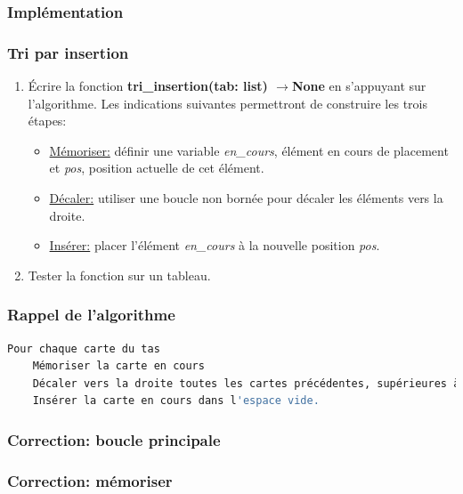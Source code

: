 \documentclass[svgnames,11pt]{beamer}
\begin{document}
\subsubsection{Implémentation}
\begin{frame}
    \frametitle{Tri par insertion}

    \begin{activite}
        \begin{enumerate}
            \item Écrire la fonction \textbf{tri\_insertion(tab: list) $\rightarrow$None} en s'appuyant sur l'algorithme. Les indications suivantes permettront de construire les trois étapes:
                  \begin{itemize}
                      \item \underline{Mémoriser:} définir une variable \emph{en\_cours}, élément en cours de placement et \emph{pos}, position actuelle de cet élément.
                      \item \underline{Décaler:} utiliser une boucle non bornée pour décaler les éléments vers la droite.
                      \item \underline{Insérer:} placer l'élément \emph{en\_cours} à la nouvelle position \emph{pos}.
                  \end{itemize}
            \item Tester la fonction sur un tableau.
        \end{enumerate}
    \end{activite}

\end{frame}

\begin{frame}[fragile]
    \frametitle{Rappel de l'algorithme}

    \begin{center}
        \begin{lstlisting}[language=bash, basicstyle=\small, xrightmargin=1em]
Pour chaque carte du tas
    Mémoriser la carte en cours
    Décaler vers la droite toutes les cartes précédentes, supérieures à la carte en cours.
    Insérer la carte en cours dans l'espace vide.
\end{lstlisting}
        \label{CODE}
    \end{center}

\end{frame}

\begin{frame}
    \frametitle{Correction: boucle principale}

    

\end{frame}
\begin{frame}
    \frametitle{Correction: mémoriser}

    

\end{frame}
\end{document}
